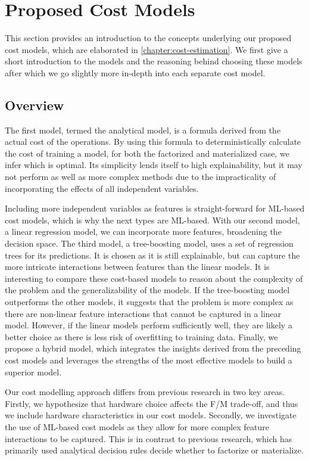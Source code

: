 \section{Proposed Cost Models}
\label{sec:4-cost-estimation}
This section provides an introduction to the concepts underlying our proposed cost models, which are elaborated in \autoref{chapter:cost-estimation}. We first give a short introduction to the models and the reasoning behind choosing these models after which we go slightly more in-depth into each separate cost model.

\subsection{Overview}
The first model, termed the analytical model, is a formula derived from the actual cost of the operations. By using this formula to deterministically calculate the cost of training a model, for both the factorized and materialized case, we infer which is optimal. Its simplicity lends itself to high explainability, but it may not perform as well as more complex methods due to the impracticality of incorporating the effects of all independent variables.

Including more independent variables as  features is straight-forward for ML-based cost models, which is why the next types are ML-based. With our second model, a linear regression model, we can incorporate more features, broadening the decision space. The third model, a tree-boosting model, uses a set of regression trees for its predictions. It is chosen as it is still explainable, but can capture the more intricate interactions between features than the linear models. It is interesting to compare these cost-based models to reason about the complexity of the problem and the generalizability of the models. If the tree-boosting model outperforms the other models, it suggests that the problem is more complex as there are non-linear feature interactions that cannot be captured in a linear model. However, if the linear models perform sufficiently well, they are likely a better choice as there is less risk of overfitting to training data. Finally, we propose a hybrid model, which integrates the insights derived from the preceding cost models and leverages the strengths of the most effective models to build a superior model.

Our cost modelling approach differs from previous research in two key areas. Firstly, we hypothesize that hardware choice affects the F/M trade-off, and thus we include hardware characteristics in our cost models. Secondly, we investigate the use of ML-based cost models as they allow for more complex feature interactions to be captured. This is in contrast to previous research, which has primarily used analytical decision rules decide whether to factorize or materialize.

